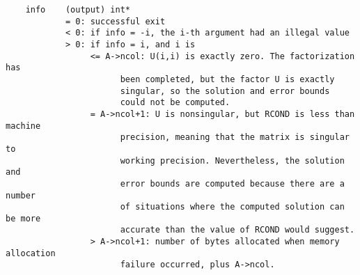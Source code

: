 \begin{verbatim}
    info    (output) int*
            = 0: successful exit   
            < 0: if info = -i, the i-th argument had an illegal value   
            > 0: if info = i, and i is   
                 <= A->ncol: U(i,i) is exactly zero. The factorization has   
                       been completed, but the factor U is exactly   
                       singular, so the solution and error bounds   
                       could not be computed.   
                 = A->ncol+1: U is nonsingular, but RCOND is less than machine
                       precision, meaning that the matrix is singular to
                       working precision. Nevertheless, the solution and
                       error bounds are computed because there are a number
                       of situations where the computed solution can be more
                       accurate than the value of RCOND would suggest.   
                 > A->ncol+1: number of bytes allocated when memory allocation
                       failure occurred, plus A->ncol.

\end{verbatim}


